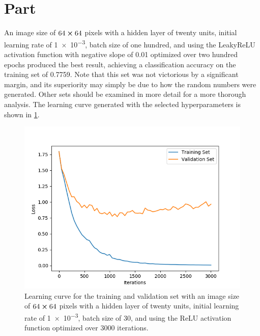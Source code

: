 \documentclass{article}
\newcommand{\enterproblemHeader}[1]{
}
\newcommand{\exitproblemHeader}[1]{
}
\newcounter{problem} %
\newcommand{\problemName}{}
\newenvironment{problem}[1][Part \theproblem]{ %
	\stepcounter{problem} %
	\renewcommand{\problemName}{#1} %
	\section{\problemName} %
	\enterproblemHeader{\problemName} %
}{
	\exitproblemHeader{\problemName} %
}
\begin{document}
\begin{problem}
	An image size of \(64\cross64\) pixels with a hidden layer of twenty units, initial learning rate of \num{1e-3}, batch size of one hundred, and using the LeakyReLU activation function with negative slope of 0.01 optimized over two hundred epochs produced the best result, achieving a classification accuracy on the training set of 0.7759. Note that this set was not victorious by a significant margin, and its superiority may simply be due to how the random numbers were generated. Other sets should be examined in more detail for a more thorough analysis. The learning curve generated with the selected hyperparameters is shown in \cref{q8}.
	\begin{figure}
		\includegraphics[width=\linewidth]{q8}
		\caption{Learning curve for the training and validation set with an image size of \(64\cross64\) pixels with a hidden layer of twenty units, initial learning rate of \num{1e-3}, batch size of 30, and using the ReLU activation function optimized over 3000 iterations.}
		\label{q8}
	\end{figure}
\end{problem}
\clearpage

\end{document}

